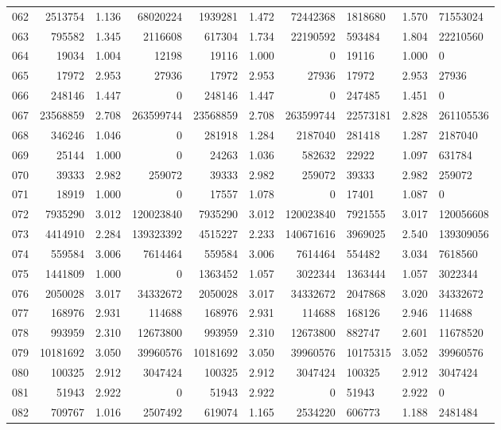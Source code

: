 \begin{longtable}{crrrrrr}
062 & 2513754 & 1.136 & 68020224 & 1939281 & 1.472 & 72442368 & 1818680 & 1.570 & 71553024 \\
063 & 795582 & 1.345 & 2116608 & 617304 & 1.734 & 22190592 & 593484 & 1.804 & 22210560 \\
064 & 19034 & 1.004 & 12198 & 19116 & 1.000 & 0 & 19116 & 1.000 & 0 \\
065 & 17972 & 2.953 & 27936 & 17972 & 2.953 & 27936 & 17972 & 2.953 & 27936 \\
066 & 248146 & 1.447 & 0 & 248146 & 1.447 & 0 & 247485 & 1.451 & 0 \\
067 & 23568859 & 2.708 & 263599744 & 23568859 & 2.708 & 263599744 & 22573181 & 2.828 & 261105536 \\
068 & 346246 & 1.046 & 0 & 281918 & 1.284 & 2187040 & 281418 & 1.287 & 2187040 \\
069 & 25144 & 1.000 & 0 & 24263 & 1.036 & 582632 & 22922 & 1.097 & 631784 \\
070 & 39333 & 2.982 & 259072 & 39333 & 2.982 & 259072 & 39333 & 2.982 & 259072 \\
071 & 18919 & 1.000 & 0 & 17557 & 1.078 & 0 & 17401 & 1.087 & 0 \\
072 & 7935290 & 3.012 & 120023840 & 7935290 & 3.012 & 120023840 & 7921555 & 3.017 & 120056608 \\
073 & 4414910 & 2.284 & 139323392 & 4515227 & 2.233 & 140671616 & 3969025 & 2.540 & 139309056 \\
074 & 559584 & 3.006 & 7614464 & 559584 & 3.006 & 7614464 & 554482 & 3.034 & 7618560 \\
075 & 1441809 & 1.000 & 0 & 1363452 & 1.057 & 3022344 & 1363444 & 1.057 & 3022344 \\
076 & 2050028 & 3.017 & 34332672 & 2050028 & 3.017 & 34332672 & 2047868 & 3.020 & 34332672 \\
077 & 168976 & 2.931 & 114688 & 168976 & 2.931 & 114688 & 168126 & 2.946 & 114688 \\
078 & 993959 & 2.310 & 12673800 & 993959 & 2.310 & 12673800 & 882747 & 2.601 & 11678520 \\
079 & 10181692 & 3.050 & 39960576 & 10181692 & 3.050 & 39960576 & 10175315 & 3.052 & 39960576 \\
080 & 100325 & 2.912 & 3047424 & 100325 & 2.912 & 3047424 & 100325 & 2.912 & 3047424 \\
081 & 51943 & 2.922 & 0 & 51943 & 2.922 & 0 & 51943 & 2.922 & 0 \\
082 & 709767 & 1.016 & 2507492 & 619074 & 1.165 & 2534220 & 606773 & 1.188 & 2481484 \\

\end{longtable}
